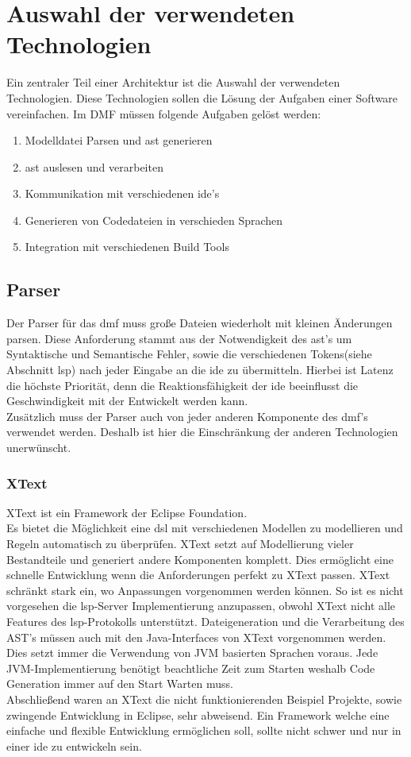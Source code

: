 \documentclass[./einleitung.tex]{subfiles}
\begin{document}
\section{Auswahl der verwendeten Technologien}
Ein zentraler Teil einer Architektur ist die Auswahl der verwendeten Technologien.
Diese Technologien sollen die Lösung der Aufgaben einer Software vereinfachen.
\newline
Im DMF müssen folgende Aufgaben gelöst werden:
\begin{enumerate}
\item Modelldatei Parsen und \acrshort{ast} generieren
\item \acrshort{ast} auslesen und verarbeiten
\item Kommunikation mit verschiedenen \acrshort{ide}'s
\item Generieren von Codedateien in verschieden Sprachen
\item Integration mit verschiedenen Build Tools
\end{enumerate}
\subsection{Parser}
Der Parser für das \acrshort{dmf} muss große Dateien wiederholt mit kleinen Änderungen parsen.
Diese Anforderung stammt aus der Notwendigkeit des \acrshort{ast}'s um Syntaktische und Semantische Fehler, sowie die verschiedenen Tokens(siehe Abschnitt \acrshort{lsp}) nach jeder Eingabe an die \acrshort{ide} zu übermitteln.
Hierbei ist Latenz die höchste Priorität, denn die Reaktionsfähigkeit der \acrshort{ide} beeinflusst die Geschwindigkeit mit der Entwickelt werden kann. \\
Zusätzlich muss der Parser auch von jeder anderen Komponente des \acrshort{dmf}'s verwendet werden.
Deshalb ist hier die Einschränkung der anderen Technologien unerwünscht.
\subsubsection{XText}
XText ist ein Framework der Eclipse Foundation.\\
Es bietet die Möglichkeit eine \acrfull{dsl} mit verschiedenen Modellen zu modellieren und Regeln automatisch zu überprüfen.
XText setzt auf Modellierung vieler Bestandteile und generiert andere Komponenten komplett.
Dies ermöglicht eine schnelle Entwicklung wenn die Anforderungen perfekt zu XText passen.
XText schränkt stark ein, wo Anpassungen vorgenommen werden können.
So ist es nicht vorgesehen die \acrshort{lsp}-Server Implementierung anzupassen, obwohl XText nicht alle Features des \acrlong{lsp}-Protokolls unterstützt.
Dateigeneration und die Verarbeitung des AST's müssen auch mit den Java-Interfaces von XText vorgenommen werden.
Dies setzt immer die Verwendung von JVM basierten Sprachen voraus.
Jede JVM-Implementierung benötigt beachtliche Zeit zum Starten weshalb Code Generation immer auf den Start Warten muss. \\
Abschließend waren an XText die nicht funktionierenden Beispiel Projekte, sowie zwingende Entwicklung in Eclipse, sehr abweisend.
Ein Framework welche eine einfache und flexible Entwicklung ermöglichen soll, sollte nicht schwer und nur in einer \acrshort{ide} zu entwickeln sein.
\end{document}
